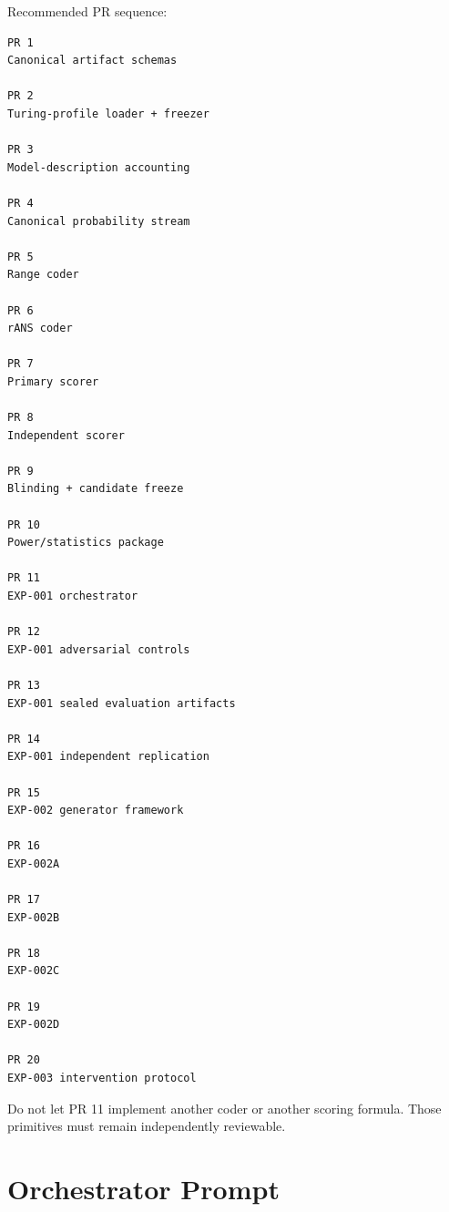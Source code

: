 \documentclass[11pt]{article}
\begin{document}
Recommended PR sequence:
\begin{verbatim}
PR 1
Canonical artifact schemas

PR 2
Turing-profile loader + freezer

PR 3
Model-description accounting

PR 4
Canonical probability stream

PR 5
Range coder

PR 6
rANS coder

PR 7
Primary scorer

PR 8
Independent scorer

PR 9
Blinding + candidate freeze

PR 10
Power/statistics package

PR 11
EXP-001 orchestrator

PR 12
EXP-001 adversarial controls

PR 13
EXP-001 sealed evaluation artifacts

PR 14
EXP-001 independent replication

PR 15
EXP-002 generator framework

PR 16
EXP-002A

PR 17
EXP-002B

PR 18
EXP-002C

PR 19
EXP-002D

PR 20
EXP-003 intervention protocol
\end{verbatim}
Do not let PR 11 implement another coder or another scoring formula. Those primitives must remain independently reviewable.

\part{Orchestrator Prompt}
\end{document}
